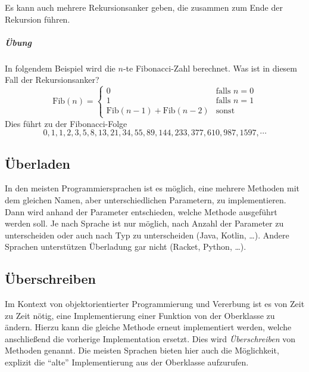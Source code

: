 		Es kann auch mehrere Rekursionsanker geben, die zusammen zum Ende der Rekursion führen.
		
		\subparagraph{Übung}
		In folgendem Beispiel wird die \(n\)-te Fibonacci-Zahl berechnet. Was ist in diesem Fall der Rekursionsanker?
		\begin{equation*}
			\text{Fib}(n) =
				\begin{cases}
					0                                     & \text{falls } n = 0 \\
					1                                     & \text{falls } n = 1 \\
					\text{Fib}(n - 1) + \text{Fib}(n - 2) & \text{sonst}
				\end{cases}
		\end{equation*}
		Dies führt zu der Fibonacci-Folge
		\begin{equation*}
			0, 1, 1, 2, 3, 5, 8, 13, 21, 34, 55, 89, 144, 233, 377, 610, 987, 1597, \cdots
		\end{equation*}

\subsection{Überladen} \functionalMark \imperativeMark \oopMark
	In den meisten Programmiersprachen ist es möglich, eine mehrere Methoden mit dem gleichen Namen, aber unterschiedlichen Parametern, zu implementieren. Dann wird anhand der Parameter entschieden, welche Methode ausgeführt werden soll. Je nach Sprache ist nur möglich, nach Anzahl der Parameter zu unterscheiden oder auch nach Typ zu unterscheiden (Java, Kotlin, \dots). Andere Sprachen unterstützen Überladung gar nicht (Racket, Python, \dots).

\subsection{Überschreiben} \oopMark
	Im Kontext von objektorientierter Programmierung und Vererbung ist es von Zeit zu Zeit nötig, eine Implementierung einer Funktion von der Oberklasse zu ändern. Hierzu kann die gleiche Methode erneut implementiert werden, welche anschließend die vorherige Implementation ersetzt. Dies wird \textit{Überschreiben} von Methoden genannt. Die meisten Sprachen bieten hier auch die Möglichkeit, explizit die \enquote{alte} Implementierung aus der Oberklasse aufzurufen.
